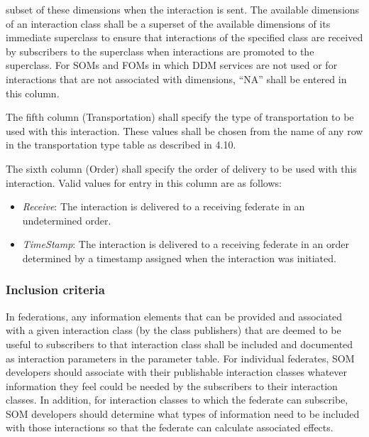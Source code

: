 \newpage
subset of these dimensions when the interaction is sent. The available dimensions of an interaction class shall be a superset of the available dimensions of its immediate superclass to ensure that interactions of the specified class are received by subscribers to the superclass when interactions are promoted to the superclass. For SOMs and FOMs in which DDM services are not used or for interactions that are not associated with dimensions, ``NA'' shall be entered in this column.

The fifth column (Transportation) shall specify the type of transportation to be used with this interaction. These values shall be chosen from the name of any row in the transportation type table as described in 4.10.

The sixth column (Order) shall specify the order of delivery to be used with this interaction. Valid values for entry in this column are as follows:
\begin{itemize}[topsep=1pt,itemsep=2pt]
\item \textit{Receive}: The interaction is delivered to a receiving federate in an undetermined order.
\item \textit{TimeStamp}: The interaction is delivered to a receiving federate in an order determined by a timestamp assigned when the interaction was initiated.
\end{itemize}

\subsubsection{Inclusion criteria}
In federations, any information elements that can be provided and associated with a given interaction class (by the class publishers) that are deemed to be useful to subscribers to that interaction class shall be included and documented as interaction parameters in the parameter table. For individual federates, SOM developers should associate with their publishable interaction classes whatever information they feel could be needed by the subscribers to their interaction classes. In addition, for interaction classes to which the federate can subscribe, SOM developers should determine what types of information need to be included with those interactions so that the federate can calculate associated effects.

